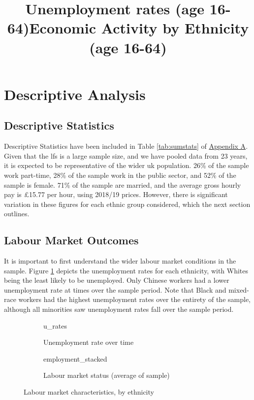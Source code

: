 \documentclass[class=article, crop=false]{standalone}
\begin{document}
\section{Descriptive Analysis}
\label{sec:Descriptive Analysis}
\subsection{Descriptive Statistics}
\label{sec:Descriptive Statistics}
Descriptive Statistics have been included in Table \ref{tab:sumstats} of \hyperref[sec:appendixA]{Appendix A}. Given that the \acrshort{lfs} is a large sample size, and we have pooled data from 23 years, it is expected to be representative of the wider \acrshort{uk} population. 26\% of the sample work part-time, 28\% of the sample work in the public sector, and 52\% of the sample is female. 71\% of the sample are married, and the average gross hourly pay is £15.77 per hour, using 2018/19 prices. However, there is significant variation in these figures for each ethnic group considered, which the next section outlines.

\subsection{Labour Market Outcomes}
\label{sec:Labour Market Outcomes}
It is important to first understand the wider labour market conditions in the sample. Figure \ref{fig:u_rates} depicts the unemployment rates for each ethnicity, with Whites being the least likely to be unemployed. Only Chinese workers had a lower unemployment rate at times over the sample period. Note that Black and mixed-race workers had the highest unemployment rates over the entirety of the sample, although all minorities saw unemployment rates fall over the sample period.
\begin{figure}[h]
\begin{subfigure}{0.5\textwidth}
\centering
    \title{Unemployment rates (age 16-64)}
    {u_rates}
    \caption{Unemployment rate over time}
    \label{fig:u_rates}
\end{subfigure}
\begin{subfigure}{0.5\textwidth}
\centering
    \title{Economic Activity by Ethnicity (age 16-64)}
    {employment_stacked}
    \caption{Labour market status (average of sample)}
    \label{fig:employment_stacked}
\end{subfigure}
\caption{Labour market characteristics, by ethnicity}
\label{fig:labour_market}
\end{figure}
\end{document}
